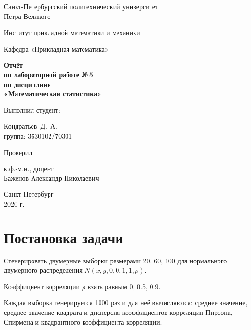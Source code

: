 \documentclass[12pt,a4paper]{article}
\begin{document}
	\begin{titlepage}
		\begin{center}			
			Санкт-Петербургский политехнический университет\\
			Петра Великого
			\vspace{0.25cm}
			
			Институт прикладной математики и механики
			
			Кафедра «Прикладная математика»
			\vfill
			
			\textbf{Отчёт\\
				по лабораторной работе №5\\
				по дисциплине\\
				«Математическая статистика»}\\[5mm]
			\bigskip
		\end{center}
		\vfill
		
		\hfill\begin{minipage}{0.45\textwidth}
			Выполнил студент:
			\vspace{0.2cm}
			
			Кондратьев~Д.~А.\\
			группа: 3630102/70301
		\end{minipage}%
		\bigskip
		
		\hfill\begin{minipage}{0.45\textwidth}
			Проверил:
			\vspace{0.2cm}
			
			к.ф.-м.н., доцент\\
			Баженов Александр Николаевич
		\end{minipage}%
		\vfill
		
		\begin{center}
			Санкт-Петербург\\
			2020 г.
		\end{center}
	\end{titlepage}
	
	
	\tableofcontents{}
	\listoftables
	\listoffigures
	
	\newpage
	\section{Постановка задачи}
	
	Сгенерировать двумерные выборки размерами 20, 60, 100 для нормального двумерного распределения $N(x, y, 0, 0, 1, 1, \rho)$.
	
	Коэффициент корреляции $\rho$ взять равным 0, 0.5, 0.9.
	
	Каждая выборка генерируется 1000 раз и для неё вычисляются: среднее значение, среднее значение квадрата и дисперсия коэффициентов корреляции Пирсона, Спирмена и квадрантного коэффициента корреляции.
	
\end{document}
